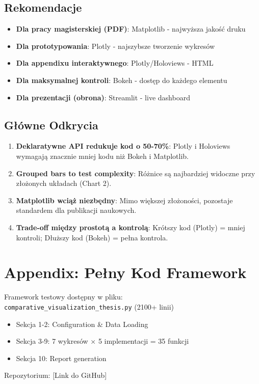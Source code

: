 \documentclass[a4paper,11pt]{article}
\begin{document}
\subsection{Rekomendacje}

\begin{itemize}
    \item \textbf{Dla pracy magisterskiej (PDF)}: Matplotlib - najwyższa jakość druku
    \item \textbf{Dla prototypowania}: Plotly - najszybsze tworzenie wykresów
    \item \textbf{Dla appendixu interaktywnego}: Plotly/Holoviews - HTML
    \item \textbf{Dla maksymalnej kontroli}: Bokeh - dostęp do każdego elementu
    \item \textbf{Dla prezentacji (obrona)}: Streamlit - live dashboard
\end{itemize}

\subsection{Główne Odkrycia}

\begin{enumerate}
    \item \textbf{Deklaratywne API redukuje kod o 50-70\%}: 
    Plotly i Holoviews wymagają znacznie mniej kodu niż Bokeh i Matplotlib.
    
    \item \textbf{Grouped bars to test complexity}: 
    Różnice są najbardziej widoczne przy złożonych układach (Chart 2).
    
    \item \textbf{Matplotlib wciąż niezbędny}: 
    Mimo większej złożoności, pozostaje standardem dla publikacji naukowych.
    
    \item \textbf{Trade-off między prostotą a kontrolą}: 
    Krótszy kod (Plotly) = mniej kontroli; Dłuższy kod (Bokeh) = pełna kontrola.
\end{enumerate}

\section{Appendix: Pełny Kod Framework}

Framework testowy dostępny w pliku: \\
\texttt{comparative\_visualization\_thesis.py} (2100+ linii)

\begin{itemize}
    \item Sekcja 1-2: Configuration \& Data Loading
    \item Sekcja 3-9: 7 wykresów × 5 implementacji = 35 funkcji
    \item Sekcja 10: Report generation
\end{itemize}

Repozytorium: [Link do GitHub]
\end{document}
